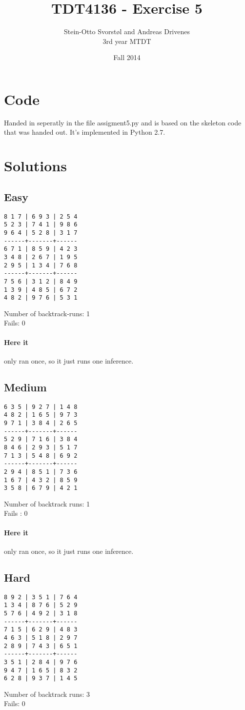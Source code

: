 \documentclass[11pt,a4paper]{article}
\author{Stein-Otto Svorstøl and Andreas Drivenes
\\3rd year MTDT}
\title{TDT4136 - Exercise 5}
\date{Fall 2014}
\begin{document}
\maketitle
\section{Code}
Handed in seperatly in the file assigment5.py and is based on the skeleton code that was handed out. It's implemented in Python 2.7.

\section{Solutions}
\subsection{Easy}
\begin{lstlisting}
8 1 7 | 6 9 3 | 2 5 4
5 2 3 | 7 4 1 | 9 8 6
9 6 4 | 5 2 8 | 3 1 7
------+-------+------
6 7 1 | 8 5 9 | 4 2 3
3 4 8 | 2 6 7 | 1 9 5
2 9 5 | 1 3 4 | 7 6 8
------+-------+------
7 5 6 | 3 1 2 | 8 4 9
1 3 9 | 4 8 5 | 6 7 2
4 8 2 | 9 7 6 | 5 3 1
\end{lstlisting}
Number of backtrack-runs: 1 \\
Fails: 0

\paragraph{Here it} only ran once, so it just runs one inference.
\pagebreak
\subsection{Medium}
\begin{lstlisting}
6 3 5 | 9 2 7 | 1 4 8
4 8 2 | 1 6 5 | 9 7 3
9 7 1 | 3 8 4 | 2 6 5
------+-------+------
5 2 9 | 7 1 6 | 3 8 4
8 4 6 | 2 9 3 | 5 1 7
7 1 3 | 5 4 8 | 6 9 2
------+-------+------
2 9 4 | 8 5 1 | 7 3 6
1 6 7 | 4 3 2 | 8 5 9
3 5 8 | 6 7 9 | 4 2 1
\end{lstlisting}
Number of backtrack runs: 1 \\
Fails : 0

\paragraph{Here it} only ran once, so it just runs one inference.
\subsection{Hard}
\begin{lstlisting}
8 9 2 | 3 5 1 | 7 6 4
1 3 4 | 8 7 6 | 5 2 9
5 7 6 | 4 9 2 | 3 1 8
------+-------+------
7 1 5 | 6 2 9 | 4 8 3
4 6 3 | 5 1 8 | 2 9 7
2 8 9 | 7 4 3 | 6 5 1
------+-------+------
3 5 1 | 2 8 4 | 9 7 6
9 4 7 | 1 6 5 | 8 3 2
6 2 8 | 9 3 7 | 1 4 5
\end{lstlisting}
Number of backtrack runs: 3  \\
Fails: 0
\end{document}
